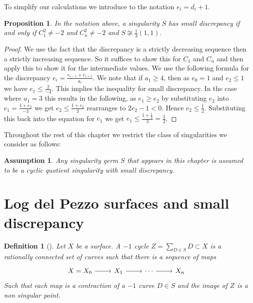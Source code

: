 \documentclass[11pt]{amsbook}
\theoremstyle{plain}
\newtheorem{prop}[thm]{Proposition}
\newtheorem{dfn}[thm]{Definition}
\newtheorem{assumption}[thm]{Assumption}
\begin{document}
To simplify our calculations we introduce to the notation $e_i = d_i + 1$. 

\begin{prop}
In the notation above,
a singularity $S$ has small discrepancy if and only if $C_1^2 \neq -2$ and $C_n^2 \neq -2$ and $ S \not\cong \frac{1}{3}(1,1)$.
\end{prop}
\begin{proof}
 We use the fact that the discrepancy is a strictly decreasing sequence then a strictly increasing sequence. So it suffices to show this for $C_1$ and $C_n$ and then apply this to show it for the intermediate values. We use the following formula for the discrepancy $e_i =  \frac{e_{i-1}+e_{i+1}}{a_i}$. We note that if $a_1 \geq 4$, then as $e_0 = 1$ and $e_2 \leq 1$ we have $e_1 \leq \frac{2}{-4}$. This implies the inequality for small discrepancy. In the case where $a_1 = 3$ this results in the following, as $e_1 \geq e_2$ by substituting $e_2$ into $e_1 = \frac{1 + e_2}{-3}$ we get  $ e_2 \leq \frac{1 + e_2}{3}$ rearranges to $2e_2 - 1 < 0$. Hence $e_2 \leq \frac{1}{2}$. Substituting this back into the equation for $e_1$ we get $e_1 \leq  \frac{1+ \frac{1}{2}}{3} =  \frac{1}{2}$. 
 \end{proof}


Throughout the rest of this chapter we restrict the class of singularities we consider as follows:

\begin{assumption}
Any singularity germ $S$ that appears in this chapter is assumed to be a cyclic
quotient singularity with small discrepancy.
\end{assumption}

\section{Log del Pezzo surfaces and small discrepancy}

\begin{dfn}[\cite{Artin}]
Let $X$ be a surface. A $-1$ cycle $Z = \sum_{D \in S} D \subset X$ is a rationally connected set of curves such that there is a sequence of maps 
\[
\begin{tikzcd}
X=X_0 \arrow[r] & X_1 \arrow[r] & \cdots \arrow[r] & X_n
\end{tikzcd}
\]
Such that each map is a contraction of a $-1$ curve $D \in S$ and the image of $Z$ is a non singular point.
\end{dfn}
\end{document}
